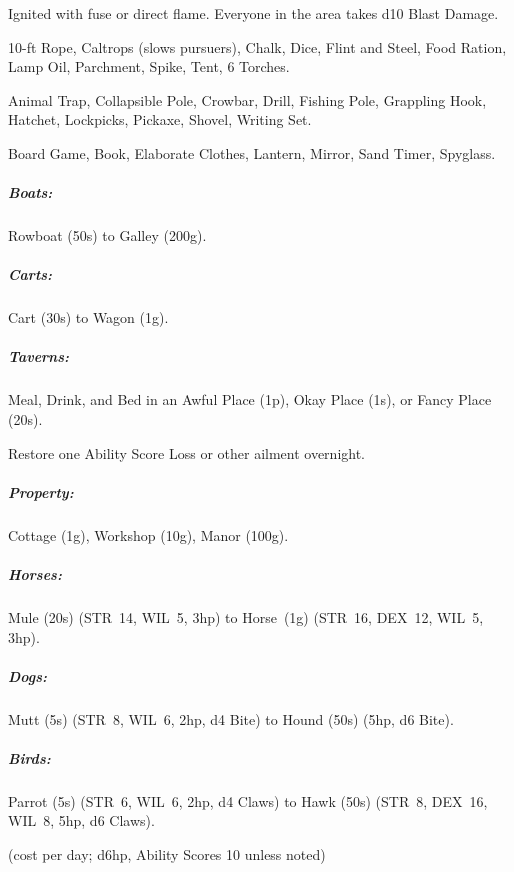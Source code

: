 \documentclass[itdr]{subfiles}
\begin{document}
 Ignited with fuse or direct flame. Everyone in the area takes d10 Blast Damage.

 10-ft Rope, Caltrops (slows pursuers), Chalk, Dice, Flint and Steel, Food Ration, Lamp Oil, Parchment, Spike, Tent, 6 Torches.

 Animal Trap, Collapsible Pole, Crowbar, Drill, Fishing Pole, Grappling Hook, Hatchet, Lockpicks, Pickaxe, Shovel, Writing Set.

 Board Game, Book, Elaborate Clothes, Lantern, Mirror, Sand Timer, Spyglass.

\vfill

\subparagraph{Boats:} Rowboat (50s) to Galley (200g).

\subparagraph{Carts:} Cart (30s) to Wagon (1g).

\subparagraph{Taverns:} Meal, Drink, and Bed in an Awful Place (1p), Okay Place (1s), or Fancy Place (20s).

 Restore one Ability Score Loss or other ailment overnight.

\subparagraph{Property:} Cottage (1g), Workshop (10g), Manor (100g).

\subparagraph{Horses:} Mule (20s) (STR~14, WIL~5, 3hp) to Horse~(1g) (STR~16, DEX~12, WIL~5, 3hp).

\subparagraph{Dogs:} Mutt (5s) (STR~8, WIL~6, 2hp, d4 Bite) to Hound (50s) (5hp, d6 Bite).

\subparagraph{Birds:} Parrot (5s) (STR~6, WIL~6, 2hp, d4 Claws) to Hawk (50s) (STR~8, DEX~16, WIL~8, 5hp, d6 Claws).

\vfill

 (cost per day; d6hp, Ability Scores 10
unless noted)
\end{document}
